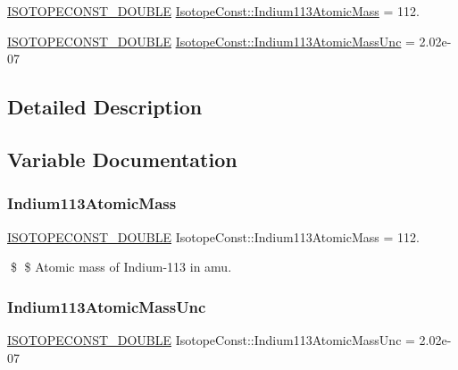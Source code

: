 \begin{DoxyCompactItemize}
\item 
\mbox{\hyperlink{group___isotope_const-_macros_ga8f45a7272ce02c0b4c65c44636ed719a}{I\+S\+O\+T\+O\+P\+E\+C\+O\+N\+S\+T\+\_\+\+D\+O\+U\+B\+LE}} \mbox{\hyperlink{group___isotope_const-_indium-_in113_gaf26444a4ba772181115c07eb506276d4}{Isotope\+Const\+::\+Indium113\+Atomic\+Mass}} = 112.
\item 
\mbox{\hyperlink{group___isotope_const-_macros_ga8f45a7272ce02c0b4c65c44636ed719a}{I\+S\+O\+T\+O\+P\+E\+C\+O\+N\+S\+T\+\_\+\+D\+O\+U\+B\+LE}} \mbox{\hyperlink{group___isotope_const-_indium-_in113_ga0730eb86917362a1c002968abf575253}{Isotope\+Const\+::\+Indium113\+Atomic\+Mass\+Unc}} = 2.\+02e-\/07
\end{DoxyCompactItemize}


\subsection{Detailed Description}


\subsection{Variable Documentation}
\mbox{\label{group___isotope_const-_indium-_in113_gaf26444a4ba772181115c07eb506276d4}} 
\subsubsection{\texorpdfstring{Indium113\+Atomic\+Mass}{Indium113AtomicMass}}
{\footnotesize\ttfamily \mbox{\hyperlink{group___isotope_const-_macros_ga8f45a7272ce02c0b4c65c44636ed719a}{I\+S\+O\+T\+O\+P\+E\+C\+O\+N\+S\+T\+\_\+\+D\+O\+U\+B\+LE}} Isotope\+Const\+::\+Indium113\+Atomic\+Mass = 112.}

\$ \$ Atomic mass of Indium-\/113 in amu. \mbox{\label{group___isotope_const-_indium-_in113_ga0730eb86917362a1c002968abf575253}} 
\subsubsection{\texorpdfstring{Indium113\+Atomic\+Mass\+Unc}{Indium113AtomicMassUnc}}
{\footnotesize\ttfamily \mbox{\hyperlink{group___isotope_const-_macros_ga8f45a7272ce02c0b4c65c44636ed719a}{I\+S\+O\+T\+O\+P\+E\+C\+O\+N\+S\+T\+\_\+\+D\+O\+U\+B\+LE}} Isotope\+Const\+::\+Indium113\+Atomic\+Mass\+Unc = 2.\+02e-\/07}

